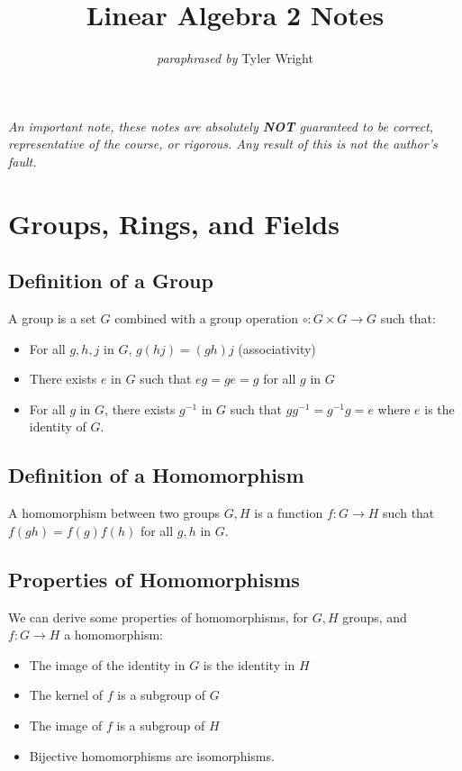 \documentclass[a4paper, 12pt, twoside]{article}
\begin{document}
\title{Linear Algebra 2 Notes}
\date{}
\author{\textit{paraphrased by} Tyler Wright}
\maketitle

\vfill

\textit{An important note, these notes are absolutely \textbf{NOT}
  guaranteed to be correct, representative of the course, or rigorous.
  Any result of this is not the author's fault.}

\newpage

\section{Groups, Rings, and Fields}

\subsection{Definition of a Group}

A group is a set $G$ combined with a group operation 
$\circ : G \times G \to G$ such that: \begin{itemize}
  \item For all $g, h, j$ in $G$, $g(hj) = (gh)j$ (associativity)
  \item There exists $e$ in $G$ such that $eg = ge = g$ for all
  $g$ in $G$
  \item For all $g$ in $G$, there exists $g^{-1}$ in $G$ such that
  $gg^{-1} = g^{-1}g = e$ where $e$ is the identity of $G$.
\end{itemize}

\subsection{Definition of a Homomorphism}

A homomorphism between two groups $G, H$ is a function $f : G \to H$
such that $f(gh) = f(g)f(h)$ for all $g, h$ in $G$.

\subsection{Properties of Homomorphisms}

We can derive some properties of homomorphisms, for
$G, H$ groups, and $f : G \to H$ a homomorphism: \begin{itemize}
  \item The image of the identity in $G$ is the identity in $H$
  \item The kernel of $f$ is a subgroup of $G$
  \item The image of $f$ is a subgroup of $H$
  \item Bijective homomorphisms are isomorphisms.
\end{itemize}
\end{document}
